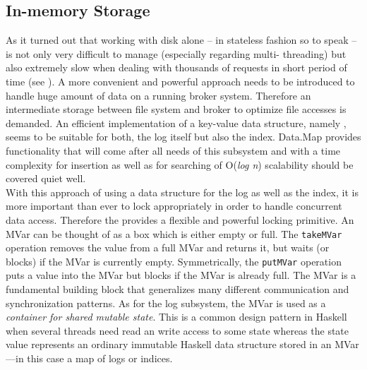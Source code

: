 



\subsection{In-memory Storage}
\label{subsec:broker-log-inmemory}

As it turned out that working with disk alone -- in stateless fashion so to
speak -- is not only very difficult to manage (especially regarding multi-
threading) but also extremely slow when
dealing with thousands of requests in short period of time (see
). A more convenient and powerful
approach needs to be introduced to handle huge amount of data on a running broker
system. Therefore an intermediate storage between file system and broker to
optimize file accesses is demanded. An efficient implementation of a key-value
data structure, namely
,
seems to be suitable for both, the log itself but also the index. Data.Map
provides functionality that will come after all needs of this subsystem and with
a time complexity for insertion as well as for searching of O(\textit{log n})
scalability should be covered quiet well. \\

With this approach of using a data structure for the log as well as the index,
it is more important than ever to lock appropriately in order to handle
concurrent data access. Therefore the
provides a flexible and powerful locking primitive. An MVar can be thought of as
a box which is either empty or full.  The \lstinline{takeMVar} operation removes
the value from a full MVar and returns it, but waits (or blocks) if the MVar is
currently empty.  Symmetrically, the \lstinline{putMVar} operation puts a value
into the MVar but blocks if the MVar is already full.  The MVar is a fundamental
building block that generalizes many different communication and synchronization
patterns. As for the log subsystem, the MVar is used as a \textit{container for
shared mutable state}. This is a common design pattern in Haskell when several
threads need read an write access to some state whereas the state value
represents an ordinary immutable Haskell data structure stored in an MVar---in
this case a map of logs or indices. \cite{marlow2013parallel}

